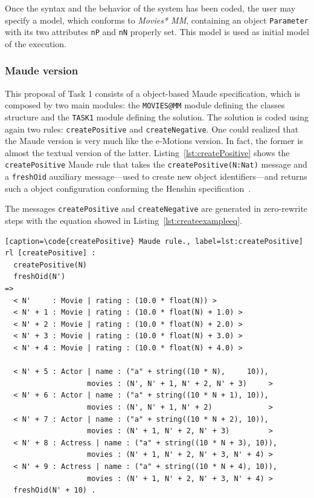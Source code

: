 \documentclass[draft]{llncs}
\newcommand{\code}[1]{{\texttt{#1}}}
\begin{document}
Once the syntax and the behavior of the system has been coded, the user may specify a model, which conforms to \textit{Movies* MM}, containing an object \code{Parameter} with its two attributes \code{nP} and \code{nN} properly set. This model is used as initial model of the execution. 

\subsubsection*{Maude version}
This proposal of Task 1 consists of a object-based Maude specification, which is composed by two main modules: the \code{MOVIES@MM} module defining the classes structure and the \code{TASK1} module defining the solution. The solution is coded using again two rules: \code{createPositive} and \code{createNegative}. One could realized that the Maude version is very much like the e-Motions version. In fact, the former is almost the textual version of the latter. Listing~\ref{lst:createPositive} shows the \code{createPositive} Maude rule that takes the \code{createPositive(N:Nat)} message and a \code{freshOid} auxiliary message---used to create new object identifiers---and returns such a object configuration conforming the Henshin specification~\cite{imdbcase}.

The messages \code{createPositive} and \code{createNegative} are generated in zero-rewrite steps with the equation showed in Listing~\ref{lst:createexampleeq}.

\begin{lstlisting}[caption=\code{createPositive} Maude rule., label=lst:createPositive]
rl [createPositive] :
  createPositive(N)
  freshOid(N')
=>
  < N'     : Movie | rating : (10.0 * float(N)) >
  < N' + 1 : Movie | rating : (10.0 * float(N) + 1.0) >
  < N' + 2 : Movie | rating : (10.0 * float(N) + 2.0) >
  < N' + 3 : Movie | rating : (10.0 * float(N) + 3.0) >
  < N' + 4 : Movie | rating : (10.0 * float(N) + 4.0) >
  
  < N' + 5 : Actor | name : ("a" + string((10 * N),     10)),
                   movies : (N', N' + 1, N' + 2, N' + 3)     >
  < N' + 6 : Actor | name : ("a" + string((10 * N + 1), 10)),
                   movies : (N', N' + 1, N' + 2)             >
  < N' + 7 : Actor | name : ("a" + string((10 * N + 2), 10)),
                   movies : (N' + 1, N' + 2, N' + 3)         >
  < N' + 8 : Actress | name : ("a" + string((10 * N + 3), 10)),
                   movies : (N' + 1, N' + 2, N' + 3, N' + 4) >
  < N' + 9 : Actress | name : ("a" + string((10 * N + 4), 10)),
                   movies : (N' + 1, N' + 2, N' + 3, N' + 4) >
  freshOid(N' + 10) .
\end{lstlisting}
\end{document}
